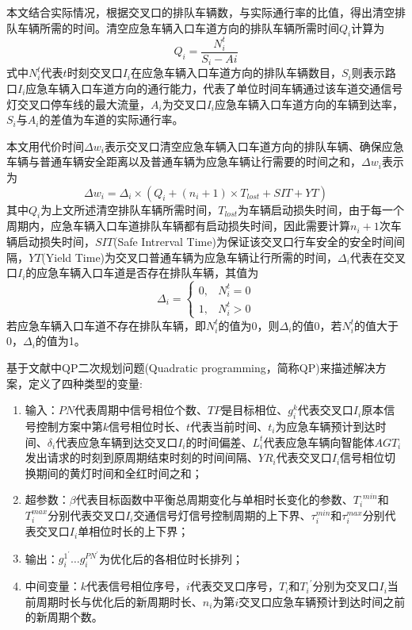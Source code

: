 本文结合实际情况，根据交叉口的排队车辆数，与实际通行率的比值，得出清空排队车辆所需的时间。清空应急车辆入口车道方向的排队车辆所需时间${Q_i}$计算为
\begin{equation}
	\label{equation:qi}
	Q_i=\frac{N_i^t}{S_i-Ai}
\end{equation}
式中${N_i^t}$代表${t}$时刻交叉口${I_i}$在应急车辆入口车道方向的排队车辆数目，${S_i}$则表示路口${I_i}$应急车辆入口车道方向的通行能力，代表了单位时间车辆通过该车道交通信号灯交叉口停车线的最大流量，${A_i}$为交叉口${I_i}$应急车辆入口车道方向的车辆到达率，${S_i}$与${A_i}$的差值为车道的实际通行率。

本文用代价时间${\Delta{w_i}}$表示交叉口清空应急车辆入口车道方向的排队车辆、确保应急车辆与普通车辆安全距离以及普通车辆为应急车辆让行需要的时间之和，${\Delta{w_i}}$表示为
\begin{equation}
	\label{equation:Delta_wi}
	\Delta{w_i}=\Delta_{i}\times(Q_i+(n_i+1) \times T_{lost} + SIT + YT )
\end{equation}
其中${Q_i}$为上文所述清空排队车辆所需时间，${T_{lost}}$为车辆启动损失时间，由于每一个周期内，应急车辆入口车道排队车辆都有启动损失时间，因此需要计算${n_i+1}$次车辆启动损失时间，${SIT}$(Safe Intrerval Time)为保证该交叉口行车安全的安全时间间隔，${YT}$(Yield Time)为交叉口普通车辆为应急车辆让行所需的时间，${\Delta_{i}}$代表在交叉口${I_i}$的应急车辆入口车道是否存在排队车辆，其值为
\begin{equation}
	\Delta_{i}=
	\begin{cases}
		0, & {N_i^t} = 0 \\
		1, & {N_i^t} > 0
	\end{cases}
	\label{equation:Delta_i}
\end{equation}
若应急车辆入口车道不存在排队车辆，即${N_i^t}$的值为0，则${\Delta_{i}}$的值0，若${N_i^t}$的值大于0，${\Delta_{i}}$的值为1。

基于文献\cite{min}中QP二次规划问题(Quadratic programming，简称QP)来描述解决方案，定义了四种类型的变量:
\begin{enumerate}
	\item 输入：${PN}$代表周期中信号相位个数、${TP}$是目标相位、${g_i^k}$代表交叉口${I_i}$原本信号控制方案中第${k}$信号相位时长、${t}$代表当前时间、${t_i}$为应急车辆预计到达时间、${\delta_i}$代表应急车辆到达交叉口${I_i}$的时间偏差、${L_i^t}$代表应急车辆向智能体${AGT_i}$发出请求的时刻到原周期结束时刻的时间间隔、${{YR}_i}$代表交叉口${I_i}$信号相位切换期间的黄灯时间和全红时间之和；
	\item 超参数：${\beta}$代表目标函数中平衡总周期变化与单相时长变化的参数、${{T_i}^{min}}$和${T_i^{max}}$分别代表交叉口${I_i}$交通信号灯信号控制周期的上下界、${\tau_i^{min}}$和${\tau_i^{max}}$分别代表交叉口${I_i}$单相位时长的上下界；
	\item 输出：${g_i^{1^\prime}\ldots{g_i^{PN^\prime}}}$为优化后的各相位时长排列；
	\item 中间变量：${k}$代表信号相位序号，${i}$代表交叉口序号，${T_i}$和${{T_i}^\prime}$分别为交叉口${I_i}$当前周期时长与优化后的新周期时长、${n_i}$为第${i}$交叉口应急车辆预计到达时间之前的新周期个数。
\end{enumerate}

